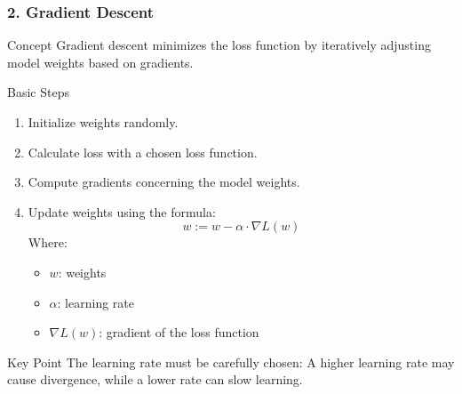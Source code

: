 \documentclass[aspectratio=169]{beamer}
\begin{document}
\begin{frame}[fragile]
    \frametitle{2. Gradient Descent}
    \begin{block}{Concept}
        Gradient descent minimizes the loss function by iteratively adjusting model weights based on gradients.
    \end{block}
    \begin{block}{Basic Steps}
        \begin{enumerate}
            \item Initialize weights randomly.
            \item Calculate loss with a chosen loss function.
            \item Compute gradients concerning the model weights.
            \item Update weights using the formula:
            \begin{equation}
                w := w - \alpha \cdot \nabla L(w)
            \end{equation}
            Where:
            \begin{itemize}
                \item \( w \): weights
                \item \( \alpha \): learning rate
                \item \( \nabla L(w) \): gradient of the loss function
            \end{itemize}
        \end{enumerate}
    \end{block}
    \begin{block}{Key Point}
        The learning rate must be carefully chosen:
        A higher learning rate may cause divergence, while a lower rate can slow learning.
    \end{block}
\end{frame}
\end{document}

